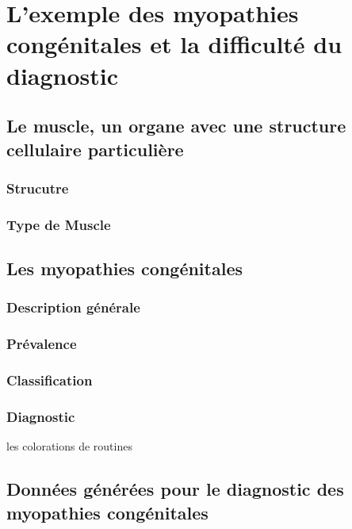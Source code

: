 \chapter{L’exemple des myopathies congénitales et la difficulté du diagnostic}
\section{Le muscle, un organe avec une structure cellulaire particulière}
\subsection{Strucutre}
\subsection{Type de Muscle}
\section{Les myopathies congénitales}
\subsection{Description générale}
\subsection{Prévalence}
\subsection{Classification}
\subsection{Diagnostic}
les colorations de routines
\section{Données générées pour le diagnostic des myopathies congénitales}